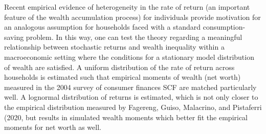   Recent empirical evidence of heterogeneity in the rate of return (an important feature of the wealth accumulation process) for individuals provide motivation for an analogous assumption for households faced with a standard consumption-saving problem. In this way, one can test the theory regarding a meaningful relationship between stochastic returns and wealth inequality within a macroeconomic setting where the conditions for a stationary model distribution of wealth are satisfied. A uniform distribution of the rate of return across households is estimated such that empirical moments of wealth (net worth) measured in the 2004 survey of consumer finances SCF are matched particularly well. A lognormal distribution of returns is estimated, which is not only closer to the empirical distribution measured by Fagereng, Guiso, Malacrino, and Pistaferri (2020, but results in simulated wealth moments which better fit the empirical moments for net worth as well.

